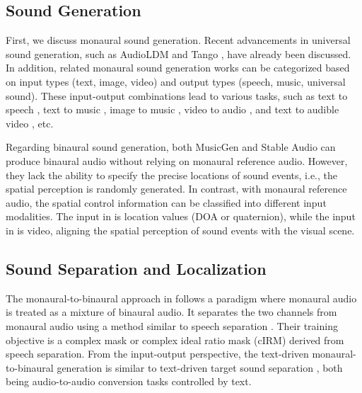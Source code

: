 \documentclass{IEEEtran}
\begin{document}
\subsection{Sound Generation}
First, we discuss monaural sound generation. Recent advancements in universal sound generation, such as AudioLDM \cite{liu2023audioldm,liu2024audioldm} and Tango \cite{ghosal2023tango,majumder2024tango}, have already been discussed. In addition, related monaural sound generation works can be categorized based on input types (text, image, video) and output types (speech, music, universal sound). These input-output combinations lead to various tasks, such as text to speech \cite{tan2024naturalspeech}, text to music \cite{chen2024musicldm}, image to music \cite{wang2023continuous}, video to audio \cite{ghose2023foleygan}, and text to audible video \cite{liu2023sounding}, etc.

Regarding binaural sound generation, both MusicGen \cite{copet2024simple} and Stable Audio \cite{evans2024stable} can produce binaural audio without relying on monaural reference audio. However, they lack the ability to specify the precise locations of sound events, i.e., the spatial perception is randomly generated. In contrast, with monaural reference audio, the spatial control information can be classified into different input modalities. The input in \cite{richard2021neural, leng2022binauralgrad} is location values (DOA or quaternion), while the input in \cite{gao20192, li2024cross, li2024cyclic} is video, aligning the spatial perception of sound events with the visual scene.

\subsection{Sound Separation and Localization}
The monaural-to-binaural approach in \cite{gao20192, li2024cross, li2024cyclic} follows a paradigm where monaural audio is treated as a mixture of binaural audio. It separates the two channels from monaural audio using a method similar to speech separation \cite{wang2018supervised}. Their training objective is a complex mask or complex ideal ratio mask (cIRM) \cite{williamson2016complex} derived from speech separation. From the input-output perspective, the text-driven monaural-to-binaural generation is similar to text-driven target sound separation \cite{liu2022separate,liu2024separate,ma2024clapsep,ma2024language}, both being audio-to-audio conversion tasks controlled by text.
\end{document}
